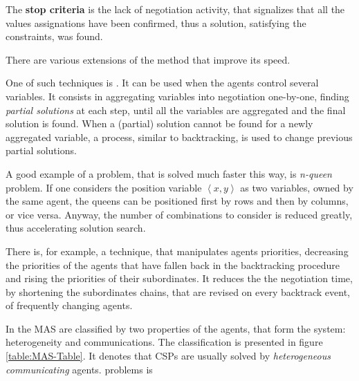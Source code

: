 The \textbf{stop criteria} is the lack of negotiation activity, that signalizes
that all the values assignations have been confirmed, thus a solution, satisfying
the constraints, was found.

\bigskip

\noindent
There are various extensions of the method that improve its speed.

One of such techniques is .
It can be used when the agents control several variables. It consists in
aggregating variables into negotiation one-by-one, finding \emph{partial solutions}
at each step, until all the variables are aggregated and the final solution
is found. When a (partial) solution cannot be found for a newly aggregated
variable, a process, similar to backtracking, is used to change previous
partial solutions.

A good example of a problem, that is solved much faster this way, is
\emph{n-queen} problem. If one considers the position variable
$\left< x,y \right>$ as two variables, owned by the same agent, the queens
can be positioned first by rows and then by columns, or vice versa. Anyway,
the number of combinations to consider is reduced greatly, thus accelerating
solution search.

There is, for example, a technique, that manipulates agents priorities,
decreasing the priorities of the agents that have fallen back in the backtracking
procedure and rising the priorities of their subordinates. It reduces the
the negotiation time, by shortening the subordinates chains, that are
revised on every backtrack event, of frequently changing agents.

\bigskip

\noindent
In \cite{MAS-Survey} the MAS are classified by two properties of the agents,
that form the system: heterogeneity and communications.
The classification is presented in figure \ref{table:MAS-Table}. It denotes
that CSPs are usually solved by \emph{heterogeneous communicating} agents.
problems is

